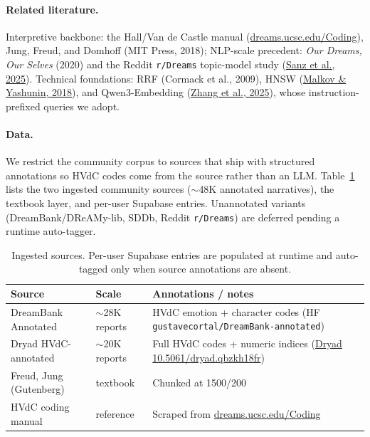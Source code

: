 \documentclass[paper=a4, fontsize=11pt]{scrartcl}
\begin{document}
\paragraph{Related literature.}
Interpretive backbone: the Hall/Van de Castle manual
(\href{https://dreams.ucsc.edu/Coding/}{dreams.ucsc.edu/Coding}), Jung,
Freud, and Domhoff (MIT Press, 2018); NLP-scale precedent:
\emph{Our Dreams, Our Selves} (2020) and the Reddit \texttt{r/Dreams}
topic-model study
(\href{https://doi.org/10.1140/epjds/s13688-025-00530-4}{Sanz et al., 2025}).
Technical foundations: RRF (Cormack et al., 2009), HNSW
(\href{https://arxiv.org/abs/1603.09320}{Malkov \& Yashunin, 2018}), and
Qwen3-Embedding
(\href{https://arxiv.org/abs/2506.05176}{Zhang et al., 2025}), whose
instruction-prefixed queries we adopt.

\paragraph{Data.}
We restrict the community corpus to sources that ship with structured
annotations so HVdC codes come from the source rather than an LLM.
Table~\ref{tab:data} lists the two ingested community sources
($\sim$48K annotated narratives), the textbook layer, and per-user
Supabase entries. Unannotated variants (DreamBank/DReAMy-lib, SDDb,
Reddit \texttt{r/Dreams}) are deferred pending a runtime auto-tagger.

\begin{table}[h]
\centering
\small
\begin{tabular}{@{}l l p{7.2cm}@{}}
\hline
Source & Scale & Annotations / notes \\
\hline
DreamBank Annotated & $\sim$28K reports & HVdC emotion + character codes (HF \texttt{gustavecortal/DreamBank-annotated}) \\
Dryad HVdC-annotated & $\sim$20K reports & Full HVdC codes + numeric indices (\href{https://datadryad.org/dataset/doi:10.5061/dryad.qbzkh18fr}{Dryad 10.5061/dryad.qbzkh18fr}) \\
Freud, Jung (Gutenberg) & textbook & Chunked at 1500/200 \\
HVdC coding manual & reference & Scraped from \href{https://dreams.ucsc.edu/Coding/}{dreams.ucsc.edu/Coding} \\
\hline
\end{tabular}
\caption{Ingested sources. Per-user Supabase entries are populated at runtime
and auto-tagged only when source annotations are absent.}
\label{tab:data}
\end{table}
\end{document}

